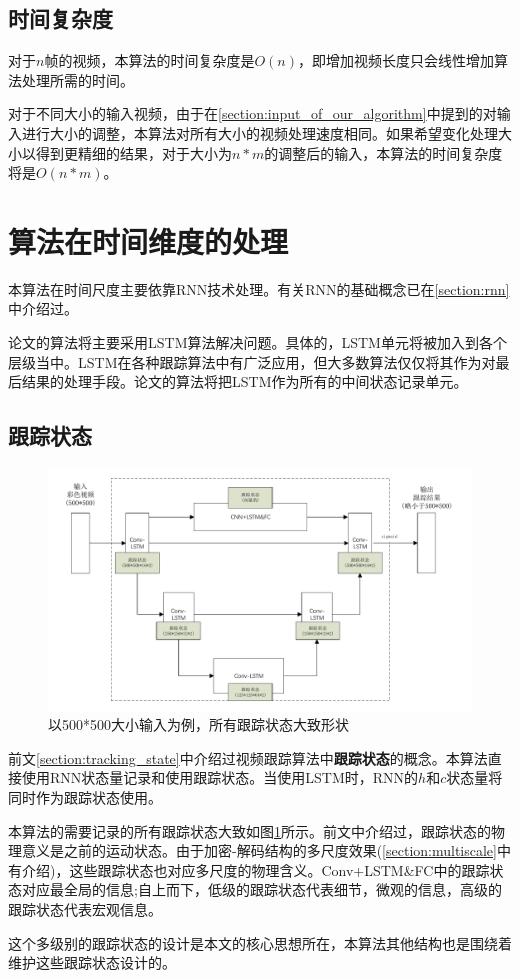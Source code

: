 \subsection{时间复杂度}
对于$n$帧的视频，本算法的时间复杂度是$O(n)$，即增加视频长度只会线性增加算法处理所需的时间。
\par
对于不同大小的输入视频，由于在\ref{section:input_of_our_algorithm}中提到的对输入进行大小的调整，本算法对所有大小的视频处理速度相同。如果希望变化处理大小以得到更精细的结果，对于大小为$n*m$的调整后的输入，本算法的时间复杂度将是$O(n*m)$。


\section{算法在时间维度的处理}
\par
本算法在时间尺度主要依靠RNN技术处理。有关RNN的基础概念已在\ref{section:rnn}中介绍过。
\par
论文的算法将主要采用LSTM算法解决问题。具体的，LSTM单元将被加入到各个层级当中。LSTM在各种跟踪算法中有广泛应用，但大多数算法仅仅将其作为对最后结果的处理手段。论文的算法将把LSTM作为所有的中间状态记录单元。

\subsection{跟踪状态}
\par
\begin{figure}
    \centering
    \includegraphics[width = 1.\textwidth]{chap/img/tracking_state.pdf}
    \caption{以500*500大小输入为例，所有跟踪状态大致形状}
    \label{fig:tracking_state}
\end{figure}
\par
前文\ref{section:tracking_state}中介绍过视频跟踪算法中\textbf{跟踪状态}的概念。本算法直接使用RNN状态量记录和使用跟踪状态。当使用LSTM时，RNN的$h$和$c$状态量将同时作为跟踪状态使用。
\par
本算法的需要记录的所有跟踪状态大致如图\ref{fig:tracking_state}所示。前文中介绍过，跟踪状态的物理意义是之前的运动状态。由于加密-解码结构的多尺度效果(\ref{section:multiscale}中有介绍)，这些跟踪状态也对应多尺度的物理含义。Conv+LSTM\&FC中的跟踪状态对应最全局的信息;自上而下，低级的跟踪状态代表细节，微观的信息，高级的跟踪状态代表宏观信息。
\par
这个多级别的跟踪状态的设计是本文的核心思想所在，本算法其他结构也是围绕着维护这些跟踪状态设计的。

